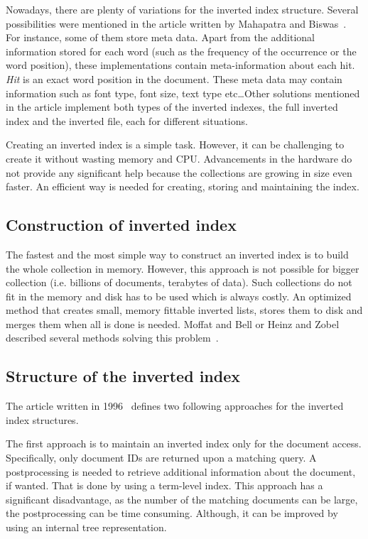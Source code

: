 Nowadays, there are plenty of variations for the inverted index structure. Several possibilities were mentioned in the article written by Mahapatra and Biswas~\cite{invindex}. For instance, some of them store meta data. Apart from the additional information stored for each word (such as the frequency of the occurrence or the word position), these implementations contain meta-information about each hit. \emph{Hit} is an exact word position in the document. These meta data may contain information such as font type, font size, text type etc\dots Other solutions mentioned in the article implement both types of the inverted indexes, the full inverted index and the inverted file, each for different situations.

Creating an inverted index is a simple task. However, it can be challenging to create it without wasting memory and CPU. Advancements in the hardware do not provide any significant help because the collections are growing in size even faster. An efficient way is needed for creating, storing and maintaining the index.

\subsection{Construction of inverted index}
The fastest and the most simple way to construct an inverted index is to build the whole collection in memory. However, this approach is not possible for bigger collection (i.e. billions of documents, terabytes of data). Such collections do not fit in the memory and disk has to be used which is always costly. An optimized method that
creates small, memory fittable inverted lists, stores them to disk and merges them when all is done is needed. Moffat and Bell or Heinz and Zobel described several methods solving this problem~\cite{invindex}.

\subsection{Structure of the inverted index}
The article written in 1996~\cite{structs} defines two following approaches for the inverted index structures.

The first approach is to maintain an inverted index only for the document access. Specifically, only document IDs are returned upon a matching query. A postprocessing is needed to retrieve additional information about the document, if wanted. That is done by using a term-level index. This approach has a significant disadvantage, as the number of the matching documents can be large, the postprocessing can be time consuming. Although, it can be improved by using an internal tree representation.


